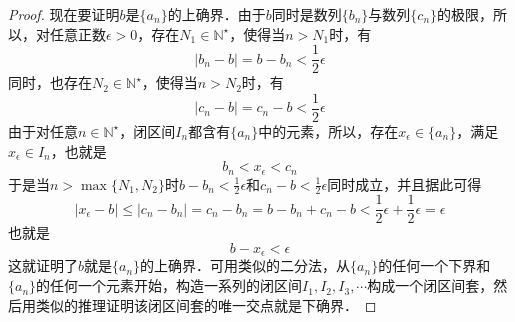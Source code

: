 \documentclass{ctexart}
\theoremstyle{definition}
\theoremstyle{definition}
\theoremstyle{plain}
\theoremstyle{plain}
\theoremstyle{plain}
\theoremstyle{definition}
\newcommand{\nat}{\mathbb{N}^\star}
\begin{document}
\begin{proof}
\noindent 现在要证明$b$是$\{a_n\}$的上确界．由于$b$同时是数列$\{b_n\}$与数列$\{c_n\}$的极限，所以，对任意正数$\epsilon >0$，存在$N_1 \in \nat$，使得当$n > N_1$时，有
\begin{equation}
    |b_n-b| = b-b_n < \frac{1}{2}\epsilon
\end{equation}
同时，也存在$N_2 \in \nat$，使得当$n >N_2$时，有
\begin{equation}
    |c_n-b|=c_n-b < \frac{1}{2}\epsilon
\end{equation}
由于对任意$n \in \nat$，闭区间$I_n$都含有$\{a_n\}$中的元素，所以，存在$x_\epsilon \in \{a_n\}$，满足$x_\epsilon \in I_n$，也就是
\begin{equation}
    b_n < x_\epsilon < c_n
\end{equation}
于是当$n > \max \{N_1, N_2\}$时$b -b_n < \displaystyle\frac{1}{2}\epsilon$和$c_n-b<\displaystyle\frac{1}{2}\epsilon$同时成立，并且据此可得
\begin{equation}
    |x_\epsilon - b| \leq |c_n-b_n|=c_n-b_n=b-b_n+c_n-b<\frac{1}{2}\epsilon+\frac{1}{2}\epsilon = \epsilon
\end{equation}
也就是
\begin{equation}
    b - x_\epsilon < \epsilon
\end{equation}
这就证明了$b$就是$\{a_n\}$的上确界．可用类似的二分法，从$\{a_n\}$的任何一个下界和$\{a_n\}$的任何一个元素开始，构造一系列的闭区间$I_1,I_2,I_3,\cdots$构成一个闭区间套，然后用类似的推理证明该闭区间套的唯一交点就是下确界．
\end{proof}
\end{document}
